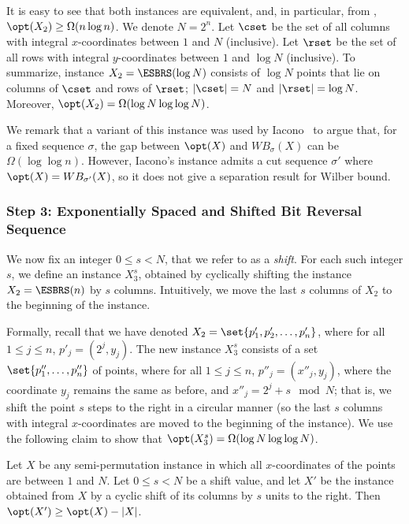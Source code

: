 \documentclass{toc}
\begin{document}
It is easy to see that both instances are equivalent, and, in particular, from , $\opt(X_2)\geq \Omega(n\log n)$.
We denote $N=2^n$. Let $\cset$ be the set of all columns with integral $x$-coordinates between $1$ and $N$ (inclusive). Let $\rset$ be the set of all rows with integral $y$-coordinates between $1$ and $\log N$ (inclusive).
 To summarize, instance $X_2=\ESBRS(\log N)$ consists of $\log N$ points that lie on columns of $\cset$ and rows of $\rset$; $|\cset|= N$ and $|\rset|=\log N$. Moreover, $\opt(X_2)=\Omega(\log N\log\log N)$.


We remark that a variant of this instance was used by Iacono~\cite{in_pursuit} to argue that, for a fixed sequence $\sigma$, the gap between $\opt(X)$ and $WB_{\sigma}(X)$ can be $\Omega(\log \log n)$. 
However, Iacono's instance admits a cut sequence $\sigma'$ where $\opt(X) = WB_{\sigma'}(X)$, so it does not give a separation result for Wilber bound.    


%
%
%
\subsubsection{Step 3: Exponentially Spaced and Shifted Bit Reversal Sequence}
%
%
%
%
We now fix an integer $0\leq s< N$, that we refer to as a \emph{shift}. For each such integer $s$, we define an instance $X^s_3$, obtained by cyclically shifting the instance $X_2=\ESBRS(n)$ by $s$ columns. Intuitively, we move the last $s$ columns of $X_2$ to the beginning of the instance. 

Formally, recall that we have denoted $X_2=\set{p'_1,p'_2,\ldots,p'_{n}}$, where for all $1\leq j\leq n$, 
$p'_j=(2^j,y_j)$. The new instance $X_3^s$ consists of a set $\set{p''_1,\ldots,p''_n}$ of points, where for  all $1\leq j\leq n$, $p''_j=(x''_j,y_j)$, where the coordinate $y_j$ remains the same as before, and $x''_j=2^j+s\mod N$; that is, we shift the point $s$ steps to the right in a circular manner (so the last $s$ columns with integral $x$-coordinates are moved to the beginning of the instance). 
We use the following claim to show that $\opt(X_3^s)=\Omega(\log N\log\log N)$.

\begin{claim}\label{claim: shifting does not hurt opt}
	Let $X$ be any semi-permutation instance in which all $x$-coordinates of the points are between $1$ and $N$. Let $0\leq s<N$ be a shift value, and let $X'$ be the instance obtained from $X$ by a cyclic shift of its columns by $s$ units to the right.  
Then $\opt(X')\geq \opt(X)-|X|$.
\end{claim}
\end{document}
